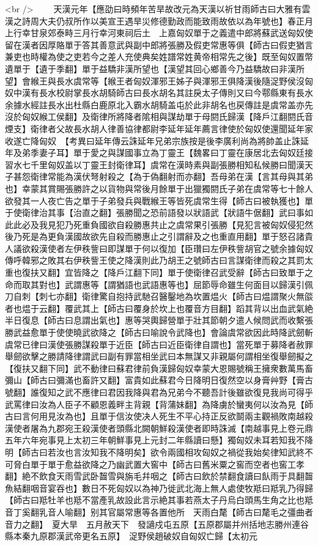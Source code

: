 <br />
　　天漢元年【應劭曰時頻年苦旱故改元為天漢以祈甘雨師古曰大雅有雲漢之詩周大夫仍叔所作以美宣王遇旱災修德勤政而能致雨故依以為年號也】春正月上行幸甘泉郊泰畤三月行幸河東祠后土　上嘉匈奴單于之義遣中郎將蘇武送匈奴使留在漢者因厚賂單于答其善意武與副中郎將張勝及假吏常惠等俱【師古曰假吏猶言兼吏也時權為使之吏若今之差人充使典矣姓譜常姓黄帝相常先之後】既至匈奴置幣遺單于【遺于季翻】單于益驕非漢所望也【漢望其回心鄉善今乃益驕故曰非漢所望】會緱王與長水虞常等【緱王者匈奴渾邪王姊子與渾邪王俱降漢後隨浞野侯沒匈奴中漢有長水校尉掌長水胡騎師古曰長水胡名其註戾太子傳則又曰今鄠縣東有長水余據水經註長水出杜縣白鹿原北入霸水胡騎盖屯於此非胡名也戻傳註是虞常盖亦先沒於匈奴緱工侯翻】及衛律所將降者隂相與謀劫單于母閼氏歸漢【降戶江翻閼氏音煙支】衛律者父故長水胡人律善協律都尉李延年延年薦言律使於匈奴使還聞延年家收遂亡降匈奴　【考異曰延年傳云誅延年兄弟宗族按是後李廣利尚為將帥盖止誅延年及弟季妻子耳】單于愛之與謀國事立為丁靈王【魏畧曰丁靈在康居北去匈奴廷接習水七千里匈奴盖以丁靈王封衛律耳】虞常在漢時素與副張勝相知私候勝曰聞漢天子甚怨衛律常能為漢伏弩射殺之【為于偽翻射而亦翻】吾母弟在漢【言其母與其弟也】幸蒙其賞賜張勝許之以貨物與常後月餘單于出獵獨閼氏子弟在虞常等七十餘人欲發其一人夜亡告之單于子弟發兵與戰緱王等皆死虞常生得【師古曰被執獲也】單于使衛律治其事【治直之翻】張勝聞之恐前語發以狀語武【狀語牛倨翻】武曰事如此此必及我見犯乃死重負國欲自殺勝惠共止之虞常果引張勝【見犯言被匈奴侵犯然後乃死是為更負漢國故欲先自殺而勝惠止之引謂辭及之也重直用翻】單于怒召諸貴人議欲殺漢使者左伊秩訾曰即謀單于何以復加【臣瓚曰左伊秩訾胡官之號余據匈奴傳呼韓邪之敗其右伊秩訾王使之降漢則此乃胡王之號師古曰言謀衛律而殺之其罰太重也復扶又翻】宜皆降之【降戶江翻下同】單于使衛律召武受辭【師古曰致單于之命而取其對也】武謂惠等【謂猶語也武語惠等也】屈節辱命雖生何面目以歸漢引佩刀自刺【刺七亦翻】衛律驚自抱持武馳召醫鑿地為坎置煴火【師古曰煴謂聚火無燄者也煴于云翻】覆武其上【師古曰覆身於坎上也覆音方目翻】蹈其背以出血武氣絶半日復息【師古曰息謂出氣也】惠等哭輿歸營單于壯其節朝夕遣人候問武而收繫張勝武益愈單于使使曉武欲降之【師古曰喻說令武降也】會論虞常欲因此時降武劒斬虞常已律曰漢使張勝謀殺單于近臣【師古曰近臣衛律自謂也】當死單于募降者赦罪舉劒欲擊之勝請降律謂武曰副有罪當相坐武曰本無謀又非親屬何謂相坐復舉劒擬之【復扶又翻下同】武不動律曰蘇君律前負漢歸匈奴幸蒙大恩賜號稱王擁衆數萬馬畜彌山【師古曰彌滿也畜許又翻】富貴如此蘇君今日降明日復然空以身膏艸野【膏古號翻】誰復知之武不應律曰君因我降與君為兄弟今不聽吾計後雖欲復見我尚可得乎武罵律曰汝為人臣子不顧恩義畔主背親【背蒲妹翻】為降虜於蠻夷何以汝為見【師古曰言何用見汝為也】且單于信汝使决人死生不平心持正反欲鬬兩主觀禍敗南越殺漢使者屠為九郡宛王殺漢使者頭縣北闕朝鮮殺漢使者即時誅滅【南越事見上卷元鼎五年六年宛事見上太初三年朝鮮事見上元封二年縣讀曰懸】獨匈奴未耳若知我不降明【師古曰若汝也言汝知我不降明矣】欲令兩國相攻匈奴之禍從我始矣律知武終不可脅白單于單于愈益欲降之乃幽武置大窖中【師古曰舊米粟之窖而空者也窖工孝翻】絶不飲食天雨雪武卧齧雪與旃毛幷咽之【師古曰飲於禁翻食讀曰飤雨于具翻齧魚結翻咽音宴吞也】數日不死匈奴以為神乃徙武北海上無人處使牧羝曰羝乳乃得歸【師古曰羝牡羊也羝不當產乳故設此言示絶其事若燕太子丹烏白頭馬生角之比也羝音丁奚翻乳音人喻翻】别其官屬常惠等各置他所　天雨白氂【師古曰氂毛之彊曲者音力之翻】　夏大旱　五月赦天下　發讁戍屯五原【五原郡屬并州括地志勝州連谷縣本秦九原郡漢武帝更名五原】　浞野侯趙破奴自匈奴亡歸【太初元